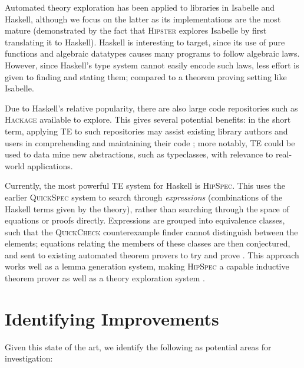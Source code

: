 \documentclass{eceasst}
\begin{document}
Automated theory exploration has been applied to libraries in Isabelle
and Haskell, although we focus on the latter as its implementations are
the most mature (demonstrated by the fact that \textsc{Hipster} explores
Isabelle by first translating it to Haskell). Haskell is interesting to target,
since its use of pure functions and algebraic datatypes causes many programs to
follow algebraic laws. However, since Haskell's type system cannot easily
encode such laws, less effort is given to finding and stating them; compared to
a theorem proving setting like Isabelle.

Due to Haskell's relative popularity, there are also large code repositories
such as \textsc{Hackage} available to explore. This gives several potential
benefits: in the short term, applying TE to such repositories may assist
existing library authors and users in comprehending and maintaining their code
\cite{QuickSpec}; more notably, TE could be used to data mine new abstractions,
such as typeclasses, with relevance to real-world applications.

Currently, the most powerful TE system for Haskell is \textsc{HipSpec}.
This uses the earlier \textsc{QuickSpec} system to search through
\emph{expressions} (combinations of the Haskell terms given by the theory),
rather than searching through the space of equations or proofs directly.
Expressions are grouped into equivalence classes, such that the
\textsc{QuickCheck} counterexample finder cannot distinguish between the
elements; equations relating the members of these classes are then conjectured,
and sent to existing automated theorem provers to try and prove
\cite{rosen2012proving}. This approach works well as a lemma generation system,
making \textsc{HipSpec} a capable inductive theorem prover as well as a theory
exploration system \cite{claessen2013automating}.

\section{Identifying Improvements}\label{improve}

Given this state of the art, we identify the following as potential
areas for investigation:
\end{document}
